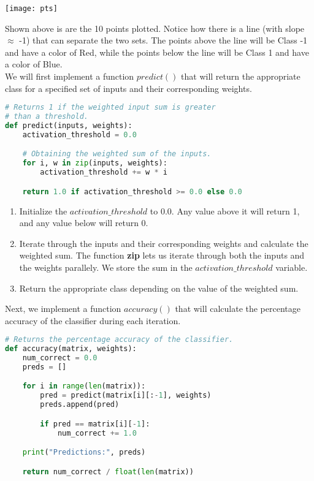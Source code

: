 	\begin{center}
		\texttt{[image: pts]}
	\end{center}
	
Shown above is are the 10 points plotted. Notice how there is a line (with slope $\approx$ -1) that can separate the two sets. The points above the line will be Class -1 and have a color of Red, while the points below the line will be Class 1 and have a color of Blue. \\

We will first implement a function $predict()$ that will return the appropriate class for a specified set of inputs and their corresponding weights. \\


	\begin{lstlisting}[language=Python, frame=single]
# Returns 1 if the weighted input sum is greater 
# than a threshold.
def predict(inputs, weights):
    activation_threshold = 0.0

    # Obtaining the weighted sum of the inputs.
    for i, w in zip(inputs, weights):
        activation_threshold += w * i

    return 1.0 if activation_threshold >= 0.0 else 0.0
	\end{lstlisting}
	
	\begin{enumerate}
		\item Initialize the $activation\_threshold$ to $0.0$. Any value above it will return 1, and any value below will return 0.
		
		\item Iterate through the inputs and their corresponding weights and calculate the weighted sum. The function \textbf{zip} lets us iterate through both the inputs and the weights parallely. We store the sum in the $activation\_threshold$ variable.
		
		\item Return the appropriate class depending on the value of the weighted sum.
	\end{enumerate}

Next, we implement a function $accuracy()$ that will calculate the percentage accuracy of the classifier during each iteration. \\ 

	\begin{lstlisting}[language=Python, frame=single]
# Returns the percentage accuracy of the classifier.
def accuracy(matrix, weights):
    num_correct = 0.0
    preds = []

    for i in range(len(matrix)):
        pred = predict(matrix[i][:-1], weights)
        preds.append(pred)

        if pred == matrix[i][-1]:
            num_correct += 1.0

    print("Predictions:", preds)

    return num_correct / float(len(matrix))
	\end{lstlisting}
	
